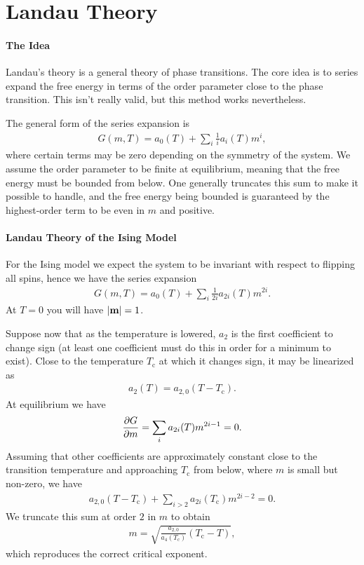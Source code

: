 \section{Landau Theory}

\paragraph{The Idea}
Landau's theory is a general theory of phase transitions. The core idea is to series expand the free energy in terms of the order parameter close to the phase transition. This isn't really valid, but this method works nevertheless.

The general form of the series expansion is
\begin{align*}
	G(m, T) = a_{0}(T) + \sum\limits_{i}\frac{1}{i}a_{i}(T)m^{i},
\end{align*}
where certain terms may be zero depending on the symmetry of the system. We assume the order parameter to be finite at equilibrium, meaning that the free energy must be bounded from below. One generally truncates this sum to make it possible to handle, and the free energy being bounded is guaranteed by the highest-order term to be even in $m$ and positive.

\paragraph{Landau Theory of the Ising Model}
For the Ising model we expect the system to be invariant with respect to flipping all spins, hence we have the series expansion
\begin{align*}
	G(m, T) = a_{0}(T) + \sum\limits_{i}\frac{1}{2i}a_{2i}(T)m^{2i}.
\end{align*}
At $T = 0$ you will have $\abs{\vb{m}} = 1$.

Suppose now that as the temperature is lowered, $a_{2}$ is the first coefficient to change sign (at least one coefficient must do this in order for a minimum to exist). Close to the temperature $T_{\text{c}}$ at which it changes sign, it may be linearized as
\begin{align*}
	a_{2}(T) = a_{2, 0}(T - T_{\text{c}}).
\end{align*}
At equilibrium we have
\begin{align*}
	\pdv{G}{m} = \sum\limits_{i}a_{2i}(T)m^{2i - 1} = 0.
\end{align*}
Assuming that other coefficients are approximately constant close to the transition temperature and approaching $T_{\text{c}}$ from below, where $m$ is small but non-zero, we have
\begin{align*}
	a_{2, 0}(T - T_{\text{c}}) + \sum\limits_{i > 2}a_{2i}(T_{\text{c}})m^{2i - 2} = 0.
\end{align*}
We truncate this sum at order $2$ in $m$ to obtain
\begin{align*}
	m = \sqrt{\frac{a_{2, 0}}{a_{4}(T_{\text{c}})}(T_{\text{c}} - T)},
\end{align*}
which reproduces the correct critical exponent.

